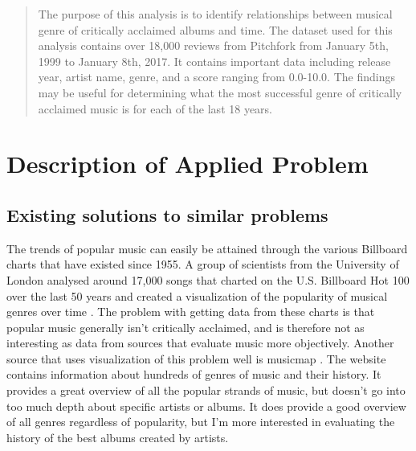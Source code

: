 \documentclass{article}
\begin{document}


\begin{abstract} 
{\bf } The purpose of this analysis is to identify relationships between
musical genre of critically acclaimed albums and time. The dataset used
for this analysis contains over 18,000 reviews from Pitchfork from
January 5th, 1999 to January 8th, 2017. It contains important data
including release year, artist name, genre, and a score ranging from
0.0-10.0. The findings may be useful for determining what the most
successful genre of critically acclaimed music is for each of the last
18 years. \end{abstract} 


\section{Description of Applied
Problem}\label{description-of-applied-problem}

\subsection{Existing solutions to similar
problems}\label{existing-solutions-to-similar-problems}

The trends of popular music can easily be attained through the various
Billboard charts that have existed since 1955. A group of scientists
from the University of London analysed around 17,000 songs that charted
on the U.S. Billboard Hot 100 over the last 50 years and created a
visualization of the popularity of musical genres over time
\citep{Billboard100}. The problem with getting data from these charts is
that popular music generally isn't critically acclaimed, and is
therefore not as interesting as data from sources that evaluate music
more objectively. Another source that uses visualization of this problem
well is musicmap \citep{musicmap}. The website contains information
about hundreds of genres of music and their history. It provides a great
overview of all the popular strands of music, but doesn't go into too
much depth about specific artists or albums. It does provide a good
overview of all genres regardless of popularity, but I'm more interested
in evaluating the history of the best albums created by artists.
\end{document}
